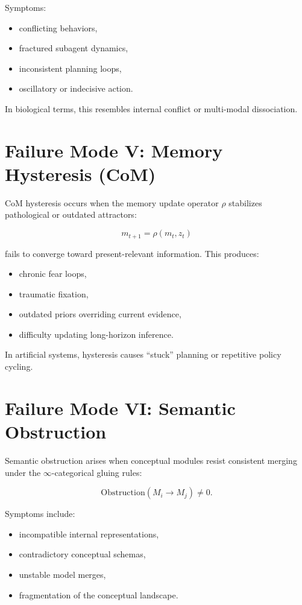 \documentclass[12pt,oneside]{book}
\theoremstyle{plain}
\theoremstyle{definition}
\begin{document}
Symptoms:

\begin{itemize}
    \item conflicting behaviors,
    \item fractured subagent dynamics,
    \item inconsistent planning loops,
    \item oscillatory or indecisive action.
\end{itemize}

In biological terms, this resembles internal conflict or multi-modal
dissociation.

\section{Failure Mode V: Memory Hysteresis (CoM)}

CoM hysteresis occurs when the memory update operator $\rho$ stabilizes
pathological or outdated attractors:

\[
m_{t+1} = \rho(m_t, z_t)
\]

fails to converge toward present-relevant information.
This produces:

\begin{itemize}
    \item chronic fear loops,
    \item traumatic fixation,
    \item outdated priors overriding current evidence,
    \item difficulty updating long-horizon inference.
\end{itemize}

In artificial systems, hysteresis causes ``stuck'' planning or repetitive
policy cycling.

\section{Failure Mode VI: Semantic Obstruction}

Semantic obstruction arises when conceptual modules resist consistent merging
under the $\infty$-categorical gluing rules:

\[
\mathrm{Obstruction}(M_i \to M_j) \neq 0.
\]

Symptoms include:

\begin{itemize}
    \item incompatible internal representations,
    \item contradictory conceptual schemas,
    \item unstable model merges,
    \item fragmentation of the conceptual landscape.
\end{itemize}
\end{document}
